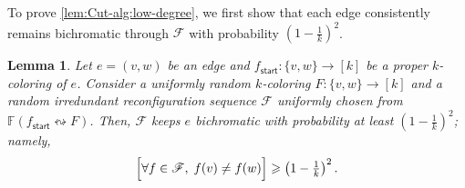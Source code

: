 \documentclass[11pt,fleqn]{article}
\renewcommand{\geq}{\geqslant}
\newcommand{\reco}{\leftrightsquigarrow}
\newcommand{\sss}{\mathsf{start}}
\newcommand{\f}{f}
\newcommand{\frnd}{F}
\newcommand{\sqcol}{\scrF}
\newcommand{\stsqcol}{\bbF}
\newcommand{\bbF}{\mathbb{F}}
\newcommand{\scrF}{\mathscr{F}}
\let\Pr\relax\DeclareMathOperator*{\Pr}{\mathbb{P}}
\newtheorem{lemma}[theorem]{Lemma}
\theoremstyle{definition}
\numberwithin{equation}{section}
\begin{document}
To prove \cref{lem:Cut-alg:low-degree},
we first show that 
each edge consistently remains bichromatic through $\sqcol$
with probability $\left(1-\frac{1}{k}\right)^2$.


\begin{lemma}
\label{lem:Cut-alg:outward}
Let $e = (v,w)$ be an edge and
$\f_\sss \colon \{v,w\} \to [k]$ be a proper $k$-coloring of $e$.
Consider a uniformly random $k$-coloring $\frnd \colon \{v,w\} \to [k]$ and
a random irredundant reconfiguration sequence $\sqcol$
uniformly chosen from $\stsqcol(\f_\sss \reco \frnd)$.
Then, $\sqcol$ keeps $e$ bichromatic with probability at least
$\left(1-\frac{1}{k}\right)^2$\textup{;}
namely,
\begin{align}
    \Pr\Bigl[
        \forall \f \in \sqcol, \;
        \f(v) \neq \f(w)
    \Bigr]
    \geq \left(1-\tfrac{1}{k}\right)^2.
\end{align}
\end{lemma}
\end{document}
